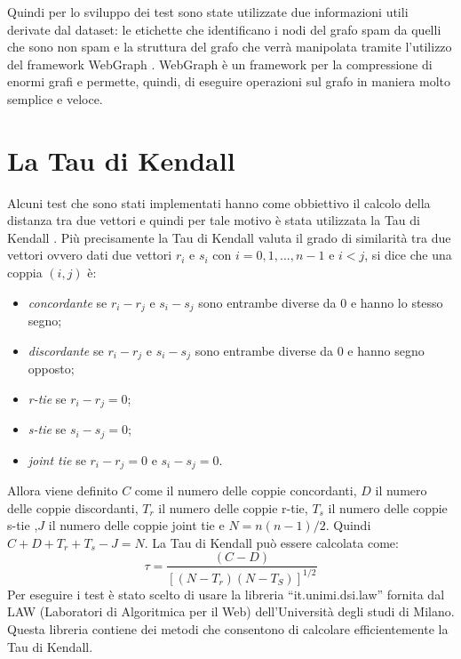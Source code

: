 Quindi per lo sviluppo dei test sono state utilizzate due informazioni utili derivate dal dataset: le etichette che identificano i nodi del grafo spam da quelli che sono non spam e la struttura del grafo che verrà manipolata tramite l'utilizzo del framework WebGraph \cite{Boldi03thewebgraph}. WebGraph è un framework per la compressione di enormi grafi e permette, quindi, di eseguire operazioni sul grafo in maniera molto semplice e veloce. 

\section{La Tau di Kendall}
Alcuni test che sono stati implementati hanno come obbiettivo il calcolo della distanza tra due vettori e quindi per tale motivo è stata utilizzata la Tau di Kendall \cite{KendallTau}. Più precisamente la Tau di Kendall valuta il grado di similarità tra due vettori ovvero dati due vettori \(r_i\) e \(s_i\) con \(i=0,1,...,n-1\) e \(i<j\), si dice che una coppia \((i,j)\) è:
\begin{itemize}
 \item \textit{concordante} se \(r_i-r_j\) e \(s_i-s_j\) sono entrambe diverse da 0 e hanno lo stesso segno;
 \item \textit{discordante} se \(r_i-r_j\) e \(s_i-s_j\) sono entrambe diverse da 0 e hanno segno opposto;
 \item \textit{r-tie} se \(r_i-r_j=0\);
 \item \textit{s-tie} se \(s_i-s_j=0\);
 \item \textit{joint tie} se \(r_i-r_j=0\) e \(s_i-s_j=0\).
\end{itemize}
Allora viene definito  \(C\) come il numero delle coppie concordanti, \(D\) il numero delle coppie discordanti, \(T_r\) il numero delle coppie r-tie, \(T_s\) il numero delle coppie s-tie ,\(J\) il numero delle coppie joint tie e \(N=n(n-1)/2\). Quindi \(C+D+T_r+T_s-J = N\). La Tau di Kendall può essere calcolata come:
\begin{equation}
 \tau = \frac{(C-D)}{[(N-T_r)(N-T_S)]^{1/2}}
\end{equation}
Per eseguire i test è stato scelto di usare la libreria  ``it.unimi.dsi.law'' \cite{libreriaLaw} fornita dal LAW (Laboratori di Algoritmica per il Web) dell'Università degli studi di Milano. Questa libreria contiene dei metodi che consentono di calcolare efficientemente la Tau di Kendall.

